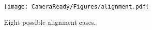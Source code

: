 \begin{figure}
\centering
\texttt{[image: CameraReady/Figures/alignment.pdf]}
\caption{Eight possible alignment cases.}
\label{fig:alignment}
\end{figure}